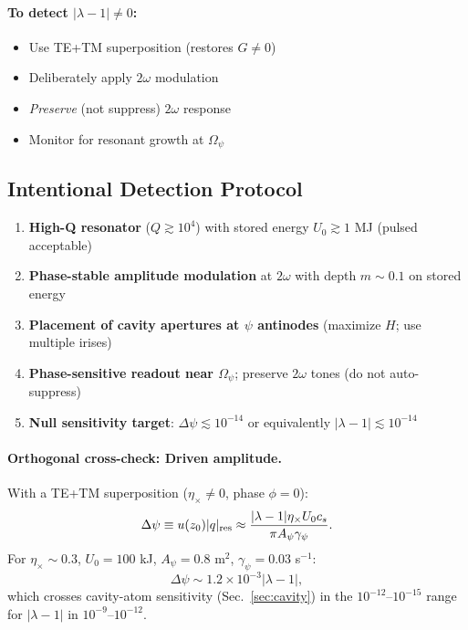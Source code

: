 \paragraph{To detect $|\lambda - 1| \neq 0$:}
\begin{itemize}
\item Use TE+TM superposition (restores $G \neq 0$)
\item Deliberately apply $2\omega$ modulation
\item \textit{Preserve} (not suppress) $2\omega$ response
\item Monitor for resonant growth at $\Omega_\psi$
\end{itemize}

\subsection{Intentional Detection Protocol}\label{sec:detection-protocol}

\begin{tcolorbox}[colback=blue!5!white, colframe=blue!50!black, title=Intentional $\psi$-Pump Detection: Required Capabilities]
\begin{enumerate}
\item \textbf{High-Q resonator} ($Q \gtrsim 10^4$) with stored energy $U_0 \gtrsim 1$ MJ 
(pulsed acceptable)

\item \textbf{Phase-stable amplitude modulation} at $2\omega$ with depth $m \sim 0.1$ 
on stored energy

\item \textbf{Placement of cavity apertures at $\psi$ antinodes} (maximize $H$; 
use multiple irises)

\item \textbf{Phase-sensitive readout near $\Omega_\psi$}; preserve $2\omega$ tones 
(do not auto-suppress)

\item \textbf{Null sensitivity target}: $\Delta\psi \lesssim 10^{-14}$ or 
equivalently $|\lambda - 1| \lesssim 10^{-14}$
\end{enumerate}
\end{tcolorbox}

\paragraph{Orthogonal cross-check: Driven amplitude.}
With a TE+TM superposition ($\eta_\times \neq 0$, phase $\phi = 0$):
\begin{equation}
\Delta\psi \equiv u(z_0)|q|_{\rm res} \approx \frac{|\lambda - 1|\eta_\times U_0 c_s}{\pi A_\psi \gamma_\psi}.
\label{eq:driven-crosscheck}
\end{equation}
For $\eta_\times \sim 0.3$, $U_0 = 100$ kJ, $A_\psi = 0.8$ m$^2$, 
$\gamma_\psi = 0.03$ s$^{-1}$:
\begin{equation}
\Delta\psi \sim 1.2 \times 10^{-3}|\lambda - 1|,
\end{equation}
which crosses cavity-atom sensitivity (Sec.~\ref{sec:cavity}) in the 
$10^{-12}$--$10^{-15}$ range for $|\lambda - 1|$ in $10^{-9}$--$10^{-12}$.

